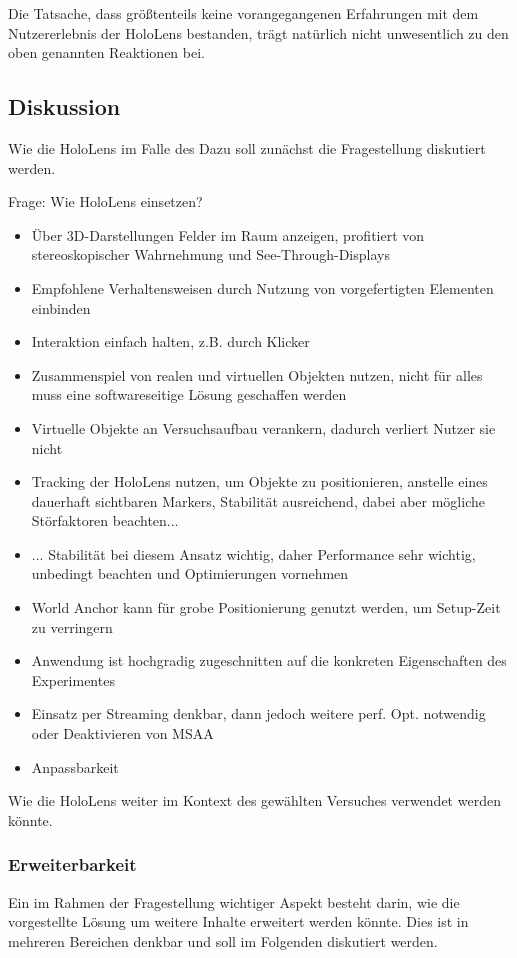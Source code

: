 Die Tatsache, dass größtenteils keine vorangegangenen Erfahrungen mit dem Nutzererlebnis der HoloLens bestanden, trägt natürlich nicht unwesentlich zu den oben genannten Reaktionen bei.\\

\subsection{Diskussion}
Wie die HoloLens im Falle des 
Dazu soll zunächst die Fragestellung diskutiert werden.

Frage: Wie HoloLens einsetzen?

\begin{itemize}
	\item Über 3D-Darstellungen Felder im Raum anzeigen, profitiert von stereoskopischer Wahrnehmung und See-Through-Displays
	\item Empfohlene Verhaltensweisen durch Nutzung von vorgefertigten Elementen einbinden
	\item Interaktion einfach halten, z.B. durch Klicker
	\item Zusammenspiel von realen und virtuellen Objekten nutzen, nicht für alles muss eine softwareseitige Lösung geschaffen werden
	\item Virtuelle Objekte an Versuchsaufbau verankern, dadurch verliert Nutzer sie nicht
	\item Tracking der HoloLens nutzen, um Objekte zu positionieren, anstelle eines dauerhaft sichtbaren Markers, Stabilität ausreichend, dabei aber mögliche Störfaktoren beachten...
	\item ... Stabilität bei diesem Ansatz wichtig, daher Performance sehr wichtig, unbedingt beachten und Optimierungen vornehmen
	\item World Anchor kann für grobe Positionierung genutzt werden, um Setup-Zeit zu verringern
	\item Anwendung ist hochgradig zugeschnitten auf die konkreten Eigenschaften des Experimentes
	\item Einsatz per Streaming denkbar, dann jedoch weitere perf. Opt. notwendig oder Deaktivieren von MSAA
	\item Anpassbarkeit
\end{itemize}

Wie die HoloLens weiter im Kontext des gewählten Versuches verwendet werden könnte.

\subsubsection{Erweiterbarkeit}
Ein im Rahmen der Fragestellung wichtiger Aspekt besteht darin, wie die vorgestellte Lösung um weitere Inhalte erweitert werden könnte. Dies ist in mehreren Bereichen denkbar und soll im Folgenden diskutiert werden.\\

